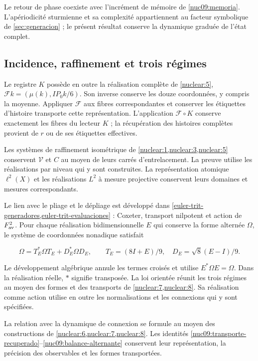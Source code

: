 Le retour de phase coexiste avec l’incrément de mémoire de
\eqref{nuc09:memoria}.
L’apériodicité sturmienne et sa complexité appartiennent au facteur
symbolique de \cref{sec:generacion} ; le présent résultat conserve
la dynamique graduée de l’état complet.

\subsection{Incidence, raffinement et trois régimes}

Le registre \(K\) possède en outre la réalisation complète de
\cref{nuclear:5},
\(\mathcal Fk=(\mu(k),IP_0k/6)\).
Son inverse conserve les douze coordonnées, y compris la moyenne.
Appliquer \(\mathcal F\) aux fibres correspondantes et conserver
les étiquettes d’histoire transporte cette représentation.
L’application \(\mathcal F\circ K\) conserve exactement les fibres
du lecteur \(K\) ; la récupération des histoires complètes provient
de \(r\) ou de ses étiquettes effectives.

Les systèmes de raffinement isométrique de
\cref{nuclear:1,nuclear:3,nuclear:5} conservent
\(\mathcal V\) et \(C\) au moyen de leurs carrés d’entrelacement.
La preuve utilise les réalisations par niveau qui y sont construites.
La représentation atomique \(\ell^2(X)\) et les réalisations
\(L^2\) à mesure projective conservent leurs domaines
et mesures correspondants.

Le lien avec le pliage et le dépliage est développé dans
\cref{euler-trit-generadores,euler-trit-evaluaciones} :
Coxeter, transport nilpotent et action de \(F_{\rm av}^2\).
Pour chaque réalisation bidimensionnelle \(E\) qui conserve la forme
alternée \(\Omega\), le système de coordonnées nonadique satisfait



\begin{equation}
\Omega=T_E^*\Omega T_E+D_E^*\Omega D_E,
\qquad T_E=(8I+E)/9,\quad D_E=\sqrt8(E-I)/9.
\label{nuc09:balance-alternante}
\end{equation}



Le développement algébrique annule les termes croisés et utilise
\(E^*\Omega E=\Omega\). Dans la réalisation réelle,
\(*\) signifie transposée.
La loi orientée réunit les trois régimes au moyen des formes
et des transports de \cref{nuclear:7,nuclear:8}.
Sa réalisation comme action utilise en outre les normalisations
et les connexions qui y sont spécifiées.

La relation avec la dynamique de connexion se formule au moyen
des constructions de \cref{nuclear:6,nuclear:7,nuclear:8}.
Les identités
\eqref{nuc09:transporte-recuperado}--\eqref{nuc09:balance-alternante}
conservent leur représentation, la précision des observables
et les formes transportées.

